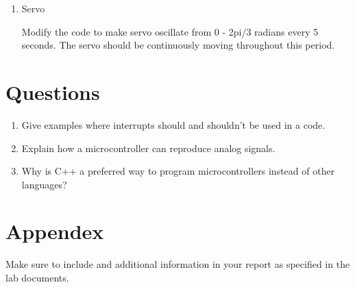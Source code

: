 \documentclass[12pt]{article}
\begin{document}
\begin{enumerate}
\item Servo

Modify the code to make servo oscillate from 0 - 2pi/3 radians every 5 seconds. The servo should be continuously moving throughout this period. 

\end{enumerate}

\clearpage
\section{Questions}

\begin{enumerate}
\item Give examples where interrupts should and shouldn't be used in a code.
\item Explain how a microcontroller can reproduce analog signals.
\item Why is C++ a preferred way to program microcontrollers instead of other languages?
\end{enumerate}

\section{Appendex}

Make sure to include and additional information in your report as specified in the lab documents.
\end{document}
